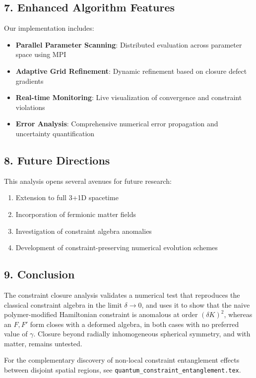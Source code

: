 \documentclass[12pt]{article}
\begin{document}
\subsection*{7. Enhanced Algorithm Features}
Our implementation includes:
\begin{itemize}
  \item \textbf{Parallel Parameter Scanning}: Distributed evaluation across parameter space using MPI
  \item \textbf{Adaptive Grid Refinement}: Dynamic refinement based on closure defect gradients
  \item \textbf{Real-time Monitoring}: Live visualization of convergence and constraint violations
  \item \textbf{Error Analysis}: Comprehensive numerical error propagation and uncertainty quantification
\end{itemize}

\subsection*{8. Future Directions}
This analysis opens several avenues for future research:
\begin{enumerate}
  \item Extension to full 3+1D spacetime
  \item Incorporation of fermionic matter fields
  \item Investigation of constraint algebra anomalies
  \item Development of constraint-preserving numerical evolution schemes
\end{enumerate}

\subsection*{9. Conclusion}
The constraint closure analysis validates a numerical test that reproduces the classical constraint algebra in the limit $\delta\to0$, and uses it to show that the naive polymer-modified Hamiltonian constraint is anomalous at order $(\delta K)^2$, whereas an $F,F'$ form closes with a deformed algebra, in both cases with no preferred value of $\gamma$.  Closure beyond radially inhomogeneous spherical symmetry, and with matter, remains untested.

For the complementary discovery of non-local constraint entanglement effects between disjoint spatial regions, see \texttt{quantum\_constraint\_entanglement.tex}.
\end{document}
